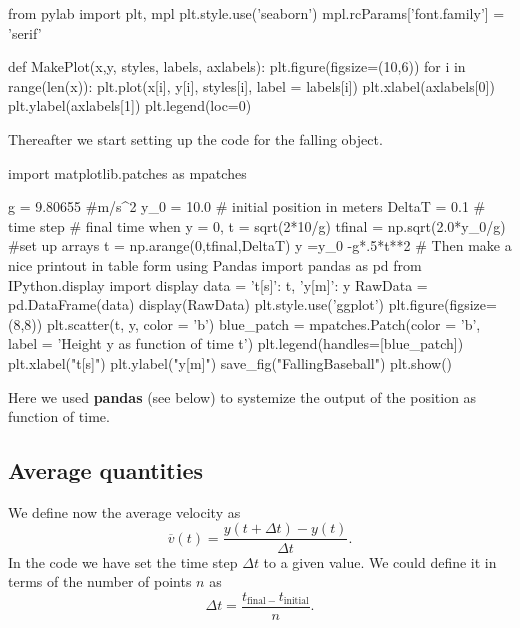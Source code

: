 \documentclass[%
oneside,                 %
final,                   %
10pt]{article}
\begin{document}
\bpycod
from pylab import plt, mpl
plt.style.use('seaborn')
mpl.rcParams['font.family'] = 'serif'

def MakePlot(x,y, styles, labels, axlabels):
    plt.figure(figsize=(10,6))
    for i in range(len(x)):
        plt.plot(x[i], y[i], styles[i], label = labels[i])
        plt.xlabel(axlabels[0])
        plt.ylabel(axlabels[1])
    plt.legend(loc=0)

\epycod


Thereafter we start setting up the code for the falling object.






























\bpycod
import matplotlib.patches as mpatches

g = 9.80655 #m/s^2
y_0 = 10.0 # initial position in meters
DeltaT = 0.1  # time step
# final time when y = 0, t = sqrt(2*10/g)
tfinal = np.sqrt(2.0*y_0/g)
#set up arrays 
t = np.arange(0,tfinal,DeltaT)
y =y_0 -g*.5*t**2
# Then make a nice printout in table form using Pandas
import pandas as pd
from IPython.display import display
data = {'t[s]': t,
        'y[m]': y
        }
RawData = pd.DataFrame(data)
display(RawData)
plt.style.use('ggplot')
plt.figure(figsize=(8,8))
plt.scatter(t, y, color = 'b')
blue_patch = mpatches.Patch(color = 'b', label = 'Height y as function of  time t')
plt.legend(handles=[blue_patch])
plt.xlabel("t[s]")
plt.ylabel("y[m]")
save_fig("FallingBaseball")
plt.show()

\epycod


Here we used \textbf{pandas} (see below) to systemize the output of the position as function of time.

\subsection{Average quantities}
We define now the average velocity as
\[
\overline{v}(t) = \frac{y(t+\Delta t)-y(t)}{\Delta t}.
\]
In the code we have set the time step $\Delta t$ to a given value. We could define it in terms of the number of points $n$ as
\[
\Delta t = \frac{t_{\mathrm{final}-}t_{\mathrm{initial}}}{n}.
\]
\end{document}
